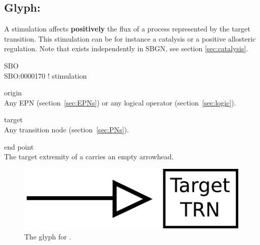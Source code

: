 
\subsection{Glyph: }\label{sec:stimulation}

A stimulation affects \textbf{positively} the flux of a process represented by the target transition. This stimulation can be for instance a catalysis or a positive allosteric regulation. Note that  exists independently in SBGN, see section \ref{sec:catalysis}.

\begin{glyphDescription}
 \item[SBO]\mbox{}\\ SBO:0000170 ! stimulation
 \item[origin]\mbox{}\\ Any EPN (section~\ref{sec:EPNs}) or any logical operator (section~\ref{sec:logic}).
 \item[target]\mbox{}\\ Any transition node (section~\ref{sec:PNs}).
 \item[end point]\mbox{}\\ The target extremity of a  carries an empty arrowhead.
 \end{glyphDescription}

\begin{figure}[H]
  \centering
  \includegraphics[scale = 0.5]{images/stimulation}
  \caption{The \PD glyph for .}
  \label{fig:stimulation}
\end{figure}


